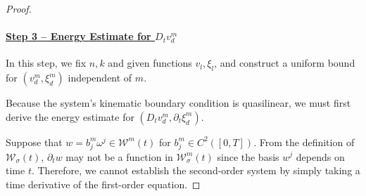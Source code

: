 \documentclass[letterpaper,reqno,10pt,twoside]{amsart}
\theoremstyle{definition}
\theoremstyle{remark}
\begin{document}
\begin{proof}
		\paragraph{\underline{Step 3 -- Energy Estimate for $D_tv_{d}^m$}}
		
		In this step, we fix $n,k$ and given functions $v_{l},\xi_{l}$, and construct a uniform bound for $(v_{d}^{m},\xi_{d}^{m})$ independent of $m$. 
		
		Because the system’s kinematic boundary condition is quasilinear, we must first derive the energy estimate for $(D_{t}v_{d}^{m},\partial_{t}\xi_{d}^{m})$. 
		
		Suppose that $w=b_j^m\omega^j\in\mathcal{W}^m(t)$ for $b_j^m\in C^2([0, T])$. From the definition of $\mathcal{W}_{\sigma}(t)$, $\partial_{t}w$ may not be a function in $\mathcal{W}_{\sigma}^{m}(t)$ since the basis $w^{j}$ depends on time $t$. Therefore, we cannot establish the second-order system by simply taking a time derivative of the first-order equation. 
		

\end{proof}
\end{document}

